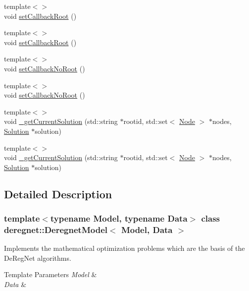 \begin{DoxyCompactItemize}
\item 
{\footnotesize template$<$$>$ }\\void \hyperlink{classderegnet_1_1DeregnetModel_a8f10c7fabb80842cd27eb10d31289bbb}{set\+Callback\+Root} ()
\item 
{\footnotesize template$<$$>$ }\\void \hyperlink{classderegnet_1_1DeregnetModel_a1d62ef7fd28d6316d549712bf9214e54}{set\+Callback\+Root} ()
\item 
{\footnotesize template$<$$>$ }\\void \hyperlink{classderegnet_1_1DeregnetModel_a2aacf97af86f2c0f62b9fe4857443400}{set\+Callback\+No\+Root} ()
\item 
{\footnotesize template$<$$>$ }\\void \hyperlink{classderegnet_1_1DeregnetModel_a53356bbd16a9a2bfb51fcdf35da9cc7a}{set\+Callback\+No\+Root} ()
\item 
{\footnotesize template$<$$>$ }\\void \hyperlink{classderegnet_1_1DeregnetModel_ae031344d7bef7965ecbff1af301cc32b}{\+\_\+get\+Current\+Solution} (std\+::string $\ast$rootid, std\+::set$<$ \hyperlink{namespacederegnet_a744bad34f2de9856d36715a445f027f3}{Node} $>$ $\ast$nodes, \hyperlink{structderegnet_1_1Solution}{Solution} $\ast$solution)
\item 
{\footnotesize template$<$$>$ }\\void \hyperlink{classderegnet_1_1DeregnetModel_a38d98fe20d193181c7c5d0655f3c0808}{\+\_\+get\+Current\+Solution} (std\+::string $\ast$rootid, std\+::set$<$ \hyperlink{namespacederegnet_a744bad34f2de9856d36715a445f027f3}{Node} $>$ $\ast$nodes, \hyperlink{structderegnet_1_1Solution}{Solution} $\ast$solution)
\end{DoxyCompactItemize}


\subsection{Detailed Description}
\subsubsection*{template$<$typename Model, typename Data$>$\newline
class deregnet\+::\+Deregnet\+Model$<$ Model, Data $>$}

Implements the mathematical optimization problems which are the basis of the De\+Reg\+Net algorithms. 


\begin{DoxyTemplParams}{Template Parameters}
{\em Model} & \\
\hline
{\em Data} & \\
\hline
\end{DoxyTemplParams}



